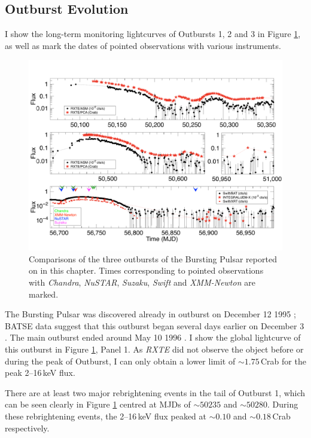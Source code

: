\subsection{Outburst Evolution}

\par I show the long-term monitoring lightcurves of Outbursts 1, 2 and 3 in Figure \ref{fig:global_ob}, as well as mark the dates of pointed observations with various instruments.

\begin{figure}
  \centering
  \includegraphics[width=.9\linewidth, trim={0cm 0 0cm 0},clip]{images/lc_comp.pdf}
  \caption[Comparisons of three outbursts of the Bursting Pulsar.]{\small Comparisons of the three outbursts of the Bursting Pulsar reported on in this chapter.  Times corresponding to pointed observations with \textit{Chandra}, \textit{NuSTAR}, \textit{Suzaku}, \textit{Swift} and \textit{XMM-Newton} are marked.}
  \label{fig:global_ob}
\end{figure}

\par The Bursting Pulsar was discovered already in outburst on December 12 1995 \citep{Fishman_Discovery}; BATSE data suggest that this outburst began several days earlier on December 3 \citep{Paciesas_BPDiscovery,Bildsten_Rev}.  The main outburst ended around May 10 1996 \citep{Woods_PulseBursts}.  I show the global lightcurve of this outburst in Figure \ref{fig:global_ob}, Panel 1.  As \textit{RXTE} did not observe the object before or during the peak of Outburst, I can only obtain a lower limit of $\sim1.75$\,Crab for the peak 2--16\,keV flux.
\par There are at least two major rebrightening events in the tail of Outburst 1, which can be seen clearly  in Figure \ref{fig:global_ob} centred at MJDs of $\sim50235$ and $\sim50280$.  During these rebrightening events, the 2--16\,keV flux peaked at $\sim0.10$ and $\sim0.18$\,Crab respectively.


